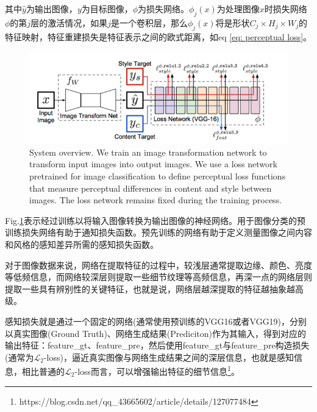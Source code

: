 \documentclass[letterpaper,12pt]{article}
\begin{document}
	其中$\hat{y}$为输出图像，$y$为目标图像，$\phi$为损失网络。$\phi_{j}(x)$为处理图像$x$时损失网络$\phi$的第$j$层的激活情况，如果$j$是一个卷积层，那么$\phi_{j}(x)$将是形状$C_{j} \times H_{j} \times W_{j}$的特征映射，特征重建损失是特征表示之间的欧式距离，如eq \ref{eq: perceptual loss}。
	
	\begin{figure}[ht] 
		\centering \includegraphics[width=0.8\columnwidth]{perceptual}
		\captionsetup{font=scriptsize}
		\caption{
			\label{fig: perceptual loss} %
			System overview. We train an image transformation network to transform input images into output images. We use a loss network pretrained for image classification to define perceptual loss functions that measure perceptual differences in content and style between images. The loss network remains fixed during the training process.
		}
	\end{figure}
	
	Fig.\ref{fig: perceptual loss}表示经过训练以将输入图像转换为输出图像的神经网络。用于图像分类的预训练损失网络有助于通知损失函数。预先训练的网络有助于定义测量图像之间内容和风格的感知差异所需的感知损失函数。
	
	对于图像数据来说，网络在提取特征的过程中，较浅层通常提取边缘、颜色、亮度等低频信息，而网络较深层则提取一些细节纹理等高频信息，再深一点的网络层则提取一些具有辨别性的关键特征，也就是说，网络层越深提取的特征越抽象越高级。
	
	感知损失就是通过一个固定的网络(通常使用预训练的VGG16或者VGG19)，分别以真实图像(Ground Truth)、网络生成结果(Prediciton)作为其输入，得到对应的输出特征：feature\_gt、feature\_pre，然后使用feature\_gt与feature\_pre构造损失(通常为$\mathcal{L}_2$-loss)，逼近真实图像与网络生成结果之间的深层信息，也就是感知信息，相比普通的$\mathcal{L}_2$-loss而言，可以增强输出特征的细节信息\footnote{https://blog.csdn.net/qq\_43665602/article/details/127077484}。
	
\end{document}
